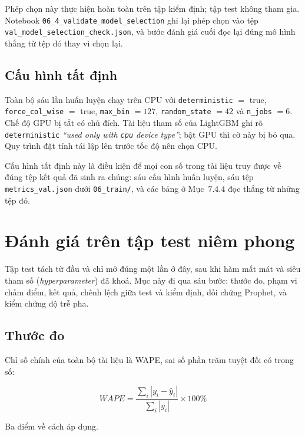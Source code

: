 Phép chọn này thực hiện hoàn toàn trên tập kiểm định; tập test không tham gia. Notebook
\texttt{06\_4\_validate\_model\_selection} ghi lại phép chọn vào tệp
\texttt{val\_model\_selection\_check.json}, và bước đánh giá cuối đọc lại đúng mô hình thắng
từ tệp đó thay vì chọn lại.

\FloatBarrier
\subsection{Cấu hình tất định}

Toàn bộ sáu lần huấn luyện chạy trên CPU với \texttt{deterministic} $=$ true,
\texttt{force\_col\_wise} $=$ true, \texttt{max\_bin} $=127$, \texttt{random\_state} $=42$ và
\texttt{n\_jobs} $=6$. Chế độ GPU bị tắt có chủ đích. Tài liệu tham số của LightGBM ghi rõ
\texttt{deterministic} \textit{``used only with \texttt{cpu} device type''}; bật GPU thì cờ này
bị bỏ qua. Quy trình đặt tính tái lập lên trước tốc độ nên chọn CPU.



Cấu hình tất định này là điều kiện để mọi con số trong tài liệu truy được về đúng tệp kết
quả đã sinh ra chúng: sáu cấu hình huấn luyện, sáu tệp \texttt{metrics\_val.json} dưới
\texttt{06\_train/}, và các bảng ở Mục~$7.4.4$ đọc thẳng từ những tệp đó.

\FloatBarrier
\section{Đánh giá trên tập test niêm phong}

Tập test tách từ đầu và chỉ mở đúng một lần ở đây, sau khi hàm mất mát và siêu tham số
(\textit{hyperparameter}) đã khoá. Mục này đi qua sáu bước: thước đo, phạm vi chấm điểm, kết
quả, chênh lệch giữa test và kiểm định, đối chứng Prophet, và kiểm chứng độ trễ pha.

\FloatBarrier
\subsection{Thước đo}

Chỉ số chính của toàn bộ tài liệu là WAPE, sai số phần trăm tuyệt đối có trọng số:

\begin{equation}
WAPE = \frac{\sum_i \left| y_i - \hat{y}_i \right|}{\sum_i \left| y_i \right|} \times 100\%
\end{equation}

Ba điểm về cách áp dụng.

